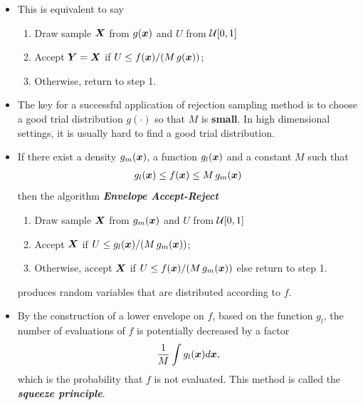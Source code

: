 \documentclass[11pt]{article}
\begin{document}
\begin{itemize}
\item This is equivalent to say 
\begin{enumerate}
\item Draw sample $\boldsymbol{X}$ from $g(\boldsymbol{x})$ and $U$ from ${\mathcal U}[0,1]$

\item Accept $\boldsymbol{Y} = \boldsymbol{X}$ if $U\le f(\boldsymbol{x})/(M\,g(\boldsymbol{x}))$; 

\item Otherwise, return to step 1.
\end{enumerate}

\item The key for a successful application of rejection sampling method is to choose a good trial distribution $g(\cdot)$ so that $M$ is \textbf{small}. In high dimensional settings, it is usually hard to find a good trial distribution.

\item \begin{lemma}
If there exist a density $g_{m}(\boldsymbol{x})$, a function $g_{l}(\boldsymbol{x})$ and a constant $M$ such that
\begin{align*}
g_l(\boldsymbol{x}) \le f(\boldsymbol{x}) \le M\,g_{m}(\boldsymbol{x}) 
\end{align*}
then the algorithm \emph{\textbf{Envelope Accept-Reject}}
\begin{enumerate}
\item Draw sample $\boldsymbol{X}$ from $g_{m}(\boldsymbol{x})$ and $U$ from ${\mathcal U}[0,1]$

\item Accept $\boldsymbol{X}$ if $U\le g_{l}(\boldsymbol{x})/(M\,g_{m}(\boldsymbol{x}))$; 

\item Otherwise, accept $\boldsymbol{X}$ if $U\le f(\boldsymbol{x})/(M\,g_{m}(\boldsymbol{x}))$ else return to step 1.
\end{enumerate}
produces random variables that are distributed according to $f$.
\end{lemma}

\item By the construction of a lower envelope on $f$, based on the function $g_{l}$, the number of evaluations of $f$ is potentially decreased by a factor
\begin{align*}
\frac{1}{M}\int g_l(\boldsymbol{x}) d\boldsymbol{x},
\end{align*}
which is the probability that $f$ is not evaluated. This method is called the \emph{\textbf{squeeze principle}}.



\end{itemize}
\end{document}
